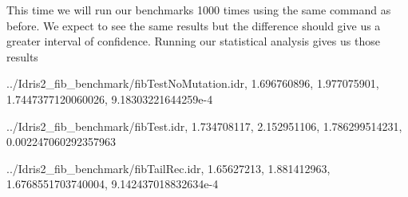 \documentclass[
]{article}
\newenvironment{Shaded}{}{}
\newcommand{\DataTypeTok}[1]{\textcolor[rgb]{0.56,0.13,0.00}{#1}}
\newcommand{\FloatTok}[1]{\textcolor[rgb]{0.25,0.63,0.44}{#1}}
\newcommand{\NormalTok}[1]{#1}
\newcommand{\OperatorTok}[1]{\textcolor[rgb]{0.40,0.40,0.40}{#1}}
\begin{document}
This time we will run our benchmarks 1000 times using the same command
as before. We expect to see the same results but the difference should
give us a greater interval of confidence. Running our statistical
analysis gives us those results

\begin{Shaded}
\begin{Highlighting}[]
\OperatorTok{../}\DataTypeTok{Idris2\_fib\_benchmark}\OperatorTok{/}\NormalTok{fibTestNoMutation}\OperatorTok{.}\NormalTok{idr,}
\FloatTok{1.696760896}\NormalTok{,}
\FloatTok{1.977075901}\NormalTok{,}
\FloatTok{1.7447377120060026}\NormalTok{,}
\FloatTok{9.18303221644259e{-}4}

\OperatorTok{../}\DataTypeTok{Idris2\_fib\_benchmark}\OperatorTok{/}\NormalTok{fibTest}\OperatorTok{.}\NormalTok{idr,}
\FloatTok{1.734708117}\NormalTok{,}
\FloatTok{2.152951106}\NormalTok{,}
\FloatTok{1.786299514231}\NormalTok{,}
\FloatTok{0.002247060292357963}

\OperatorTok{../}\DataTypeTok{Idris2\_fib\_benchmark}\OperatorTok{/}\NormalTok{fibTailRec}\OperatorTok{.}\NormalTok{idr,}
\FloatTok{1.65627213}\NormalTok{,}
\FloatTok{1.881412963}\NormalTok{,}
\FloatTok{1.6768551703740004}\NormalTok{,}
\FloatTok{9.142437018832634e{-}4}


\end{Highlighting}
\end{Shaded}
\end{document}

